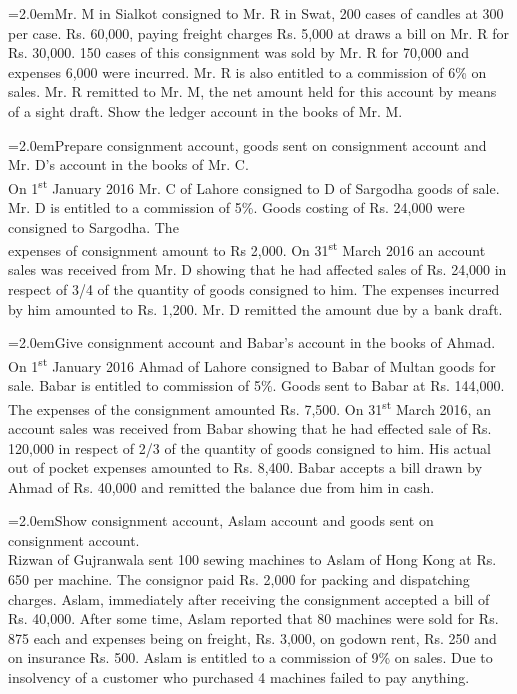 \documentclass[11pt,a4paper]{article}
\newcommand{\lqn}[2]{\Needspace{6\baselineskip}\par\medskip\noindent\hangindent=2.0em\hangafter=1\makebox[2.0em][l]{\textbf{#1.}}#2\par}
\begin{document}
\lqn{38}{Mr. M in Sialkot consigned to Mr. R in Swat, 200 cases of candles at 300 per case. Rs. 60,000, paying freight charges Rs. 5,000 at draws a bill on Mr. R for Rs. 30,000. 150 cases of this consignment was sold by Mr. R for 70,000 and expenses 6,000 were incurred. Mr. R is also entitled to a commission of 6\% on sales. Mr. R remitted to Mr. M, the net amount held for this account by means of a sight draft. Show the ledger account in the books of Mr. M.\par
}
\lqn{39}{Prepare consignment account, goods sent on consignment account and Mr. D’s account in the books of Mr. C.\\
On 1\textsuperscript{st}  January 2016 Mr. C of Lahore consigned to D of Sargodha goods of sale. Mr. D is entitled to a commission of 5\%. Goods costing of Rs. 24,000 were consigned to Sargodha. The\\
expenses of consignment amount to Rs 2,000. On 31\textsuperscript{st}  March 2016 an account sales was received from Mr. D showing that he had affected sales of Rs. 24,000 in respect of 3/4 of the quantity of goods consigned to him. The expenses incurred by him amounted to Rs. 1,200. Mr. D remitted the amount due by a bank draft.\par
}
\lqn{40}{Give consignment account and Babar’s account in the books of Ahmad.\\
On 1\textsuperscript{st}  January 2016 Ahmad of Lahore consigned to Babar of Multan goods for sale. Babar is entitled to commission of 5\%. Goods sent to Babar at Rs. 144,000. The expenses of the consignment amounted Rs. 7,500. On 31\textsuperscript{st}  March 2016, an account sales was received from Babar showing that he had effected sale of Rs. 120,000 in respect of 2/3 of the quantity of goods consigned to him. His actual out of pocket expenses amounted to Rs. 8,400. Babar accepts a bill drawn by Ahmad of Rs. 40,000 and remitted the balance due from him in cash.\par
}
\lqn{41}{Show consignment account, Aslam account and goods sent on consignment account.\\
Rizwan of Gujranwala sent 100 sewing machines to Aslam of Hong Kong at Rs. 650 per machine. The consignor paid Rs. 2,000 for packing and dispatching charges. Aslam, immediately after receiving the consignment accepted a bill of Rs. 40,000. After some time, Aslam reported that 80 machines were sold for Rs. 875 each and expenses being on freight, Rs. 3,000, on godown rent, Rs. 250 and on insurance Rs. 500. Aslam is entitled to a commission of 9\% on sales. Due to insolvency of a customer who purchased 4 machines failed to pay anything.\par
}
\end{document}
